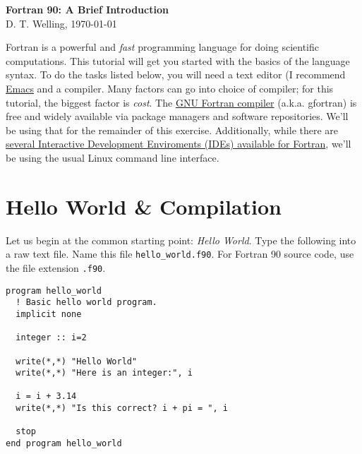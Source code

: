 \documentclass[11pt, letterpaper]{article}
\begin{document}
\setlength{\pdfpageheight}{\paperheight}
\setlength{\pdfpagewidth}{\paperwidth}

\begin{center}
  {\LARGE \textbf{Fortran 90: A Brief Introduction}\\}
  {\large D. T. Welling, \today}
\end{center}

Fortran is a powerful and \emph{fast} programming language for doing
scientific computations.  This tutorial will get you started with the basics
of the language syntax.  To do the tasks listed below, you will need a
text editor (I recommend \href{https://www.gnu.org/software/emacs/}{Emacs}
and a compiler.  Many factors can go into choice of compiler; for this
tutorial, the biggest factor is \emph{cost}.  The
\href{https://gcc.gnu.org/fortran/}{GNU Fortran compiler} (a.k.a. gfortran)
is free and widely available via package managers and software repositories.
We'll be using that for the remainder of this exercise.  Additionally,
while there are \href{https://www.google.com/webhp?sourceid=chrome-instant&ion=1&espv=2&es_th=1&ie=UTF-8#q=fortran%20ide}
  {several Interactive Development Enviroments (IDEs) available
    for Fortran}, we'll be using the usual Linux command line interface.

\section{Hello World \& Compilation}

Let us begin at the common starting point: \emph{Hello World}.  Type the
following into a raw text file.  Name this file \texttt{hello\_world.f90}.
For Fortran 90 source code, use the file extension \texttt{.f90}.

\begin{verbatim}
program hello_world
  ! Basic hello world program.
  implicit none
  
  integer :: i=2
  
  write(*,*) "Hello World"
  write(*,*) "Here is an integer:", i

  i = i + 3.14
  write(*,*) "Is this correct? i + pi = ", i

  stop
end program hello_world
\end{verbatim}
\end{document}
